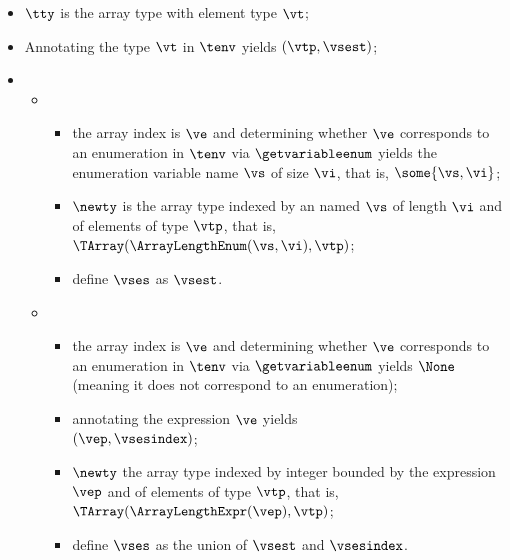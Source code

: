 \ProseParagraph
\AllApply
\begin{itemize}
  \item $\tty$ is the array type with element type $\vt$;
  \item Annotating the type $\vt$ in $\tenv$ yields $(\vtp, \vsest)$\ProseOrTypeError;
  \item \OneApplies
  \begin{itemize}
    \item {}
    \begin{itemize}
      \item the array index is $\ve$ and determining whether $\ve$ corresponds to an enumeration in $\tenv$
      via $\getvariableenum$ yields the enumeration variable
      name $\vs$ of size $\vi$, that is, $\some{ \vs, \vi }$\ProseOrTypeError;
      \item $\newty$ is the array type indexed by an \enumerationtypeterm{}
      named $\vs$ of length $\vi$ and of elements of type $\vtp$, that is, $\TArray(\ArrayLengthEnum(\vs, \vi), \vtp)$;
      \item define $\vses$ as $\vsest$.
    \end{itemize}

    \item {}
    \begin{itemize}
      \item the array index is $\ve$ and determining whether $\ve$ corresponds to an enumeration in $\tenv$
      via $\getvariableenum$ yields $\None$ (meaning it does not
      correspond to an enumeration)\ProseOrTypeError;
      \item annotating the \symbolicallyevaluableterm{} \constrainedintegerterm{} expression $\ve$ yields\\
      $(\vep, \vsesindex)$\ProseOrTypeError;
      \item $\newty$ the array type indexed by integer bounded by
      the expression $\vep$ and of elements of type $\vtp$, that is,
      $\TArray(\ArrayLengthExpr(\vep), \vtp)$;
      \item define $\vses$ as the union of $\vsest$ and $\vsesindex$.
    \end{itemize}
  \end{itemize}
\end{itemize}

\FormallyParagraph
\begin{mathpar}
\end{mathpar}

